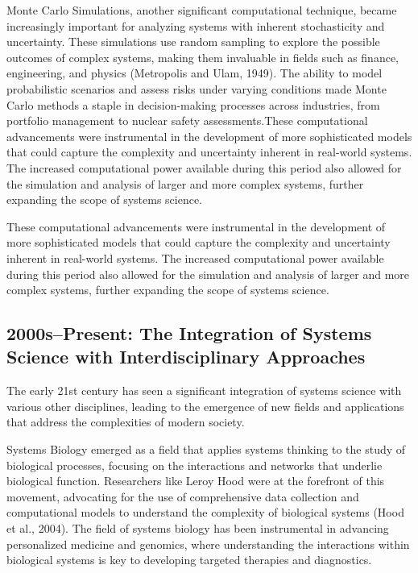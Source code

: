 \documentclass[twocolumn]{article}
\begin{document}
\textcolor{primary}{Monte Carlo Simulations, another significant computational technique, became increasingly important for analyzing systems with inherent stochasticity and uncertainty. These simulations use random sampling to explore the possible outcomes of complex systems, making them invaluable in fields such as finance, engineering, and physics (Metropolis and Ulam, 1949). The ability to model probabilistic scenarios and assess risks under varying conditions made Monte Carlo methods a staple in decision-making processes across industries, from portfolio management to nuclear safety assessments.These computational advancements were instrumental in the development of more sophisticated models that could capture the complexity and uncertainty inherent in real-world systems. The increased computational power available during this period also allowed for the simulation and analysis of larger and more complex systems, further expanding the scope of systems science.}

\textcolor{secondary}{These computational advancements were instrumental in the development of more sophisticated models that could capture the complexity and uncertainty inherent in real-world systems. The increased computational power available during this period also allowed for the simulation and analysis of larger and more complex systems, further expanding the scope of systems science.}

\subsection{2000s–Present: The Integration of Systems Science with Interdisciplinary Approaches}


\textcolor{primary}{The early 21st century has seen a significant integration of systems science with various other disciplines, leading to the emergence of new fields and applications that address the complexities of modern society.}


\textcolor{secondary}{Systems Biology emerged as a field that applies systems thinking to the study of biological processes, focusing on the interactions and networks that underlie biological function. Researchers like Leroy Hood were at the forefront of this movement, advocating for the use of comprehensive data collection and computational models to understand the complexity of biological systems (Hood et al., 2004). The field of systems biology has been instrumental in advancing personalized medicine and genomics, where understanding the interactions within biological systems is key to developing targeted therapies and diagnostics.}
\end{document}
